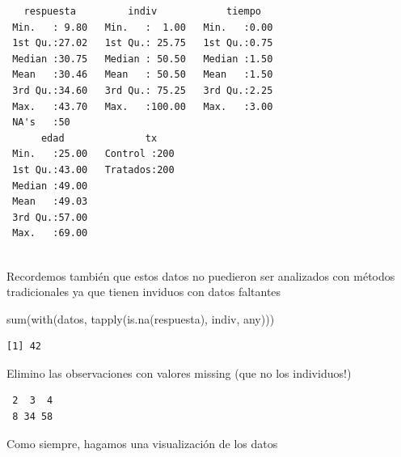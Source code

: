 \documentclass[
]{book}
\newenvironment{Shaded}{\begin{snugshade}}{\end{snugshade}}
\newcommand{\CommentTok}[1]{\textcolor[rgb]{0.56,0.35,0.01}{\textit{#1}}}
\newcommand{\FunctionTok}[1]{\textcolor[rgb]{0.00,0.00,0.00}{#1}}
\newcommand{\NormalTok}[1]{#1}
\newcommand{\OtherTok}[1]{\textcolor[rgb]{0.56,0.35,0.01}{#1}}
\newcommand{\SpecialCharTok}[1]{\textcolor[rgb]{0.00,0.00,0.00}{#1}}
\begin{document}
\begin{verbatim}
   respuesta         indiv            tiempo    
 Min.   : 9.80   Min.   :  1.00   Min.   :0.00  
 1st Qu.:27.02   1st Qu.: 25.75   1st Qu.:0.75  
 Median :30.75   Median : 50.50   Median :1.50  
 Mean   :30.46   Mean   : 50.50   Mean   :1.50  
 3rd Qu.:34.60   3rd Qu.: 75.25   3rd Qu.:2.25  
 Max.   :43.70   Max.   :100.00   Max.   :3.00  
 NA's   :50                                     
      edad              tx     
 Min.   :25.00   Control :200  
 1st Qu.:43.00   Tratados:200  
 Median :49.00                 
 Mean   :49.03                 
 3rd Qu.:57.00                 
 Max.   :69.00                 
                               
\end{verbatim}

Recordemos también que estos datos no puedieron ser analizados con métodos tradicionales ya que tienen inviduos con datos faltantes

\begin{Shaded}
\begin{Highlighting}[]
\FunctionTok{sum}\NormalTok{(}\FunctionTok{with}\NormalTok{(datos, }\FunctionTok{tapply}\NormalTok{(}\FunctionTok{is.na}\NormalTok{(respuesta), indiv, any)))}
\end{Highlighting}
\end{Shaded}

\begin{verbatim}
[1] 42
\end{verbatim}

Elimino las observaciones con valores missing (que no los individuos!)

\begin{Shaded}
\end{Shaded}

\begin{verbatim}
 2  3  4 
 8 34 58 
\end{verbatim}

Como siempre, hagamos una visualización de los datos
\end{document}
